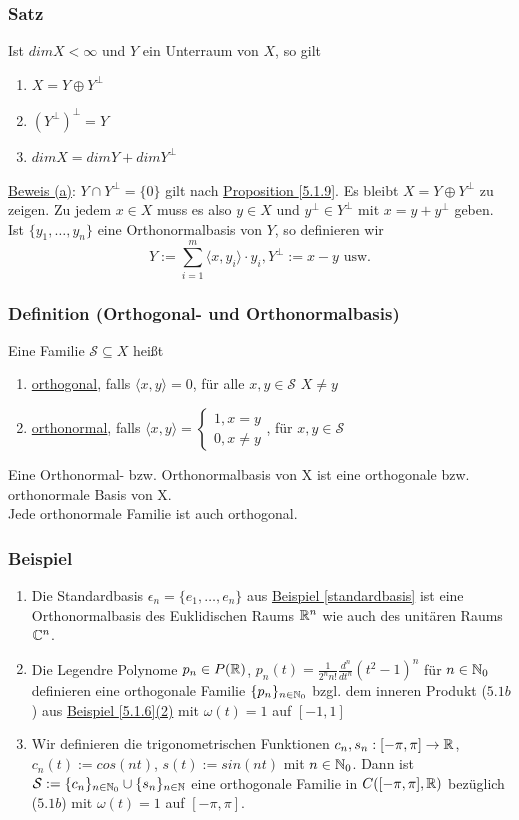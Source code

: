 \subsubsection{Satz}
Ist $dimX<\infty$ und $Y$ ein Unterraum von $X$, so gilt
\alphabet
\begin{enumerate}
\item $X=Y\oplus Y^{\bot}$
\item $(Y^{\bot})^{\bot}=Y$
\item $dimX=dimY+dimY^{\bot}$
\end{enumerate}
\underline{Beweis (a)}: $Y\cap Y^{\bot}=\{0\}$ gilt nach \hyperref[5.1.9]{Proposition \ref*{5.1.9}}. Es bleibt $X=Y\oplus Y^{\bot}$ zu zeigen. Zu jedem $x\in X$ muss es also $y\in X$ und $y^{\bot}\in Y^{\bot}$ mit $x=y+y^{\bot}$ geben. Ist $\{y_1, \dots,y_n\}$ eine Orthonormalbasis von $Y$, so definieren wir
\[Y:=\sum_{i=1}^m \langle x,y_i\rangle \cdot y_i, Y^{\bot}:=x-y\text{ usw.}\]
\subsubsection{Definition (Orthogonal- und Orthonormalbasis)}
Eine Familie $\mathcal{S} \subseteq X$ heißt
\alphabet
\begin{enumerate}
\item \underline{orthogonal}, falls $\langle x,y\rangle=0$, für alle $x,y\in \mathcal{S}$ $X\neq y$
\item \underline{orthonormal}, falls $\langle x,y\rangle=\begin{cases}1,x=y\\0,x\neq y\end{cases}$, für $x,y\in \mathcal{S}$
\end{enumerate}
Eine Orthonormal- bzw. Orthonormalbasis von X ist eine orthogonale bzw. orthonormale Basis von X.\\
Jede orthonormale Familie ist auch orthogonal.
\subsubsection{Beispiel}
\numbers
\begin{enumerate}
\item Die Standardbasis $\epsilon_n=\{e_1,\dots,e_n\}$ aus \hyperref[standardbasis]{Beispiel \ref*{standardbasis}} ist eine Orthonormalbasis des Euklidischen Raums $\mathbb{R}^n$ wie auch des unitären Raums $\mathbb{C}^n$.
\item Die Legendre Polynome $p_n\in P(\mathbb{R})$, $p_n(t)=\frac{1}{2^n n!} \frac{d^n}{dt^n} (t^2-1)^n$ für $n\in\mathbb{N}_0$ definieren eine orthogonale Familie $\{p_n\}_{n\in\mathbb{N}_0}$ bzgl. dem inneren Produkt (\hyperref[5.1b]{$5.1b$}) aus \hyperref[5.1.6]{Beispiel \ref{5.1.6}(2)} mit $\omega(t)=1$ auf $[-1,1]$
\item Wir definieren die trigonometrischen Funktionen $c_n,s_n:[-\pi,\pi]\rightarrow\mathbb{R}$, $c_n(t):=cos(nt)$, $s(t):=sin(nt)$ mit $n\in\mathbb{N}_0$. Dann ist $\mathcal{S}:=\{c_n\}_{n\in\mathbb{N}_0} \cup \{s_n\}_{n\in\mathbb{N}}$ eine orthogonale Familie in $C([-\pi,\pi],\mathbb{R})$ bezüglich (\hyperref[5.1b]{$5.1b$}) mit $\omega(t)=1$ auf $[-\pi,\pi]$.
\end{enumerate}
